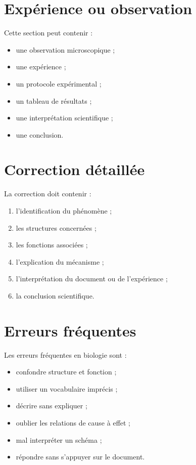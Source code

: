 \documentclass[11pt,a4paper]{article}
\begin{document}
\section{Expérience ou observation}

\begin{cadreactivite}
Cette section peut contenir :
\begin{itemize}
    \item une observation microscopique ;
    \item une expérience ;
    \item un protocole expérimental ;
    \item un tableau de résultats ;
    \item une interprétation scientifique ;
    \item une conclusion.
\end{itemize}
\end{cadreactivite}

\section{Correction détaillée}

\begin{cadresolution}
La correction doit contenir :
\begin{enumerate}
    \item l’identification du phénomène ;
    \item les structures concernées ;
    \item les fonctions associées ;
    \item l’explication du mécanisme ;
    \item l’interprétation du document ou de l’expérience ;
    \item la conclusion scientifique.
\end{enumerate}
\end{cadresolution}

\section{Erreurs fréquentes}

\begin{cadreattention}
Les erreurs fréquentes en biologie sont :
\begin{itemize}
    \item confondre structure et fonction ;
    \item utiliser un vocabulaire imprécis ;
    \item décrire sans expliquer ;
    \item oublier les relations de cause à effet ;
    \item mal interpréter un schéma ;
    \item répondre sans s’appuyer sur le document.
\end{itemize}
\end{cadreattention}
\end{document}
